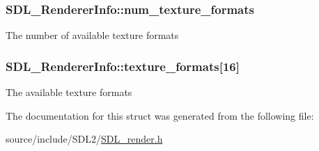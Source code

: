 \subsubsection[{num\+\_\+texture\+\_\+formats}]{ S\+D\+L\+\_\+\+Renderer\+Info\+::num\+\_\+texture\+\_\+formats}\label{struct_s_d_l___renderer_info_acdec165b2053b914313f5996983ec6b8}
The number of available texture formats \hypertarget{struct_s_d_l___renderer_info_a88450f9d48e593ec4571e3ba7cc3427d}{}
\subsubsection[{texture\+\_\+formats}]{ S\+D\+L\+\_\+\+Renderer\+Info\+::texture\+\_\+formats\mbox{[}16\mbox{]}}\label{struct_s_d_l___renderer_info_a88450f9d48e593ec4571e3ba7cc3427d}
The available texture formats 

The documentation for this struct was generated from the following file\+:\begin{DoxyCompactItemize}
\item 
source/include/\+S\+D\+L2/\hyperlink{_s_d_l__render_8h}{S\+D\+L\+\_\+render.\+h}\end{DoxyCompactItemize}
